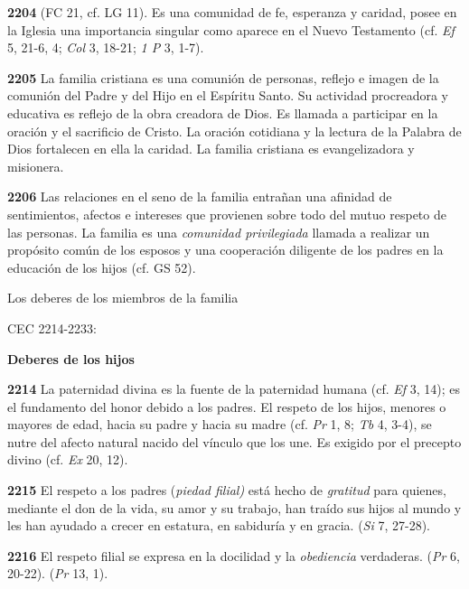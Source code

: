 \textbf{2204}  (FC 21, cf. LG 11). Es una comunidad de fe, esperanza y caridad, posee en la Iglesia una importancia singular como aparece en el Nuevo Testamento (cf. \emph{Ef} 5, 21-6, 4; \emph{Col} 3, 18-21; \emph{1 P} 3, 1-7).

\textbf{2205} La familia cristiana es una comunión de personas, reflejo e imagen de la comunión del Padre y del Hijo en el Espíritu Santo. Su actividad procreadora y educativa es reflejo de la obra creadora de Dios. Es llamada a participar en la oración y el sacrificio de Cristo. La oración cotidiana y la lectura de la Palabra de Dios fortalecen en ella la caridad. La familia cristiana es evangelizadora y misionera.

\textbf{2206} Las relaciones en el seno de la familia entrañan una afinidad de sentimientos, afectos e intereses que provienen sobre todo del mutuo respeto de las personas. La familia es una \emph{comunidad privilegiada} llamada a realizar un propósito común de los esposos y una cooperación diligente de los padres en la educación de los hijos (cf. GS 52).

Los deberes de los miembros de la familia

CEC 2214-2233:

\textbf{Deberes de los hijos}

\textbf{2214} La paternidad divina es la fuente de la paternidad humana (cf. \emph{Ef} 3, 14); es el fundamento del honor debido a los padres. El respeto de los hijos, menores o mayores de edad, hacia su padre y hacia su madre (cf. \emph{Pr} 1, 8; \emph{Tb} 4, 3-4), se nutre del afecto natural nacido del vínculo que los une. Es exigido por el precepto divino (cf. \emph{Ex} 20, 12).

\textbf{2215} El respeto a los padres (\emph{piedad filial)} está hecho de \emph{gratitud} para quienes, mediante el don de la vida, su amor y su trabajo, han traído sus hijos al mundo y les han ayudado a crecer en estatura, en sabiduría y en gracia.  (\emph{Si} 7, 27-28).

\textbf{2216} El respeto filial se expresa en la docilidad y la \emph{obediencia} verdaderas.  (\emph{Pr} 6, 20-22).  (\emph{Pr} 13, 1).

